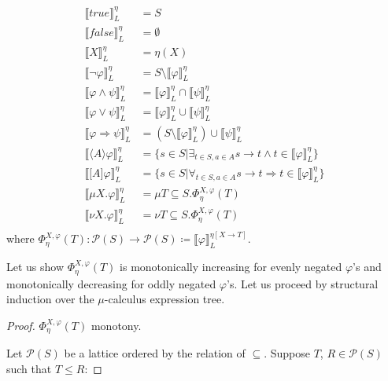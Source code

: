 \documentclass[11pt]{article}
\theoremstyle{definition}
\theoremstyle{plain}
\let\temp\phi
\let\phi\varphi
\let\varphi\temp
\begin{document}
\begin{appendices}
\begin{align*}
\llbracket true \rrbracket_L^\eta &= S \\
\llbracket false \rrbracket_L^\eta &= \emptyset \\
\llbracket X \rrbracket_L^\eta &= \eta(X) \\
\llbracket \neg\phi \rrbracket_L^\eta &= S\setminus \llbracket \phi \rrbracket_L^\eta \\
\llbracket \phi \wedge \psi \rrbracket_L^\eta &= \llbracket \phi  \rrbracket_L^\eta \cap \llbracket \psi \rrbracket_L^\eta \\
\llbracket \phi \vee \psi \rrbracket_L^\eta &= \llbracket \phi \rrbracket_L^\eta \cup \llbracket \psi \rrbracket_L^\eta \\
\llbracket \phi \Longrightarrow \psi \rrbracket_L^\eta &= (S\setminus \llbracket \phi \rrbracket_L^\eta)\cup\llbracket \psi \rrbracket_L^\eta \\
\llbracket \langle A\rangle \phi \rrbracket_L^\eta &= \{s\in S \vert \exists_{t\in S,a\in A} s\rightarrow t \wedge t \in \llbracket \phi \rrbracket_L^\eta\} \\
\llbracket \lbrack A\rbrack \phi \rrbracket_L^\eta &= \{s\in S \vert \forall_{t\in S,a\in A} s\rightarrow t \Longrightarrow t \in \llbracket \phi \rrbracket_L^\eta\} \\
\llbracket \mu X.\phi \rrbracket_L^\eta &= \mu T \subseteq S.\Phi_{\eta}^{X,\phi}(T) \\
\llbracket \nu X.\phi \rrbracket_L^\eta &= \nu T \subseteq S.\Phi_{\eta}^{X,\phi}(T) \\
\end{align*}
where $ \Phi_{\eta}^{X,\phi}(T) : \mathcal{P}(S) \rightarrow \mathcal{P}(S) \coloneqq \llbracket \phi \rrbracket_L^{\eta[X\rightarrow T]}$.

Let us show $ \Phi_{\eta}^{X,\phi}(T) $ is monotonically increasing for evenly negated $ \phi $'s and monotonically decreasing for oddly negated $ \phi $'s. Let us proceed by structural induction over the $ \mu $-calculus expression tree.

\begin{proof}
$ \Phi_{\eta}^{X,\phi}(T) $ monotony.

Let $ \mathcal{P}(S) $ be a lattice ordered by the relation of $ \subseteq $. Suppose $ T$, $R \in \mathcal{P}(S)$ such that $ T \leq R $:


\end{proof}
\end{appendices}
\end{document}
